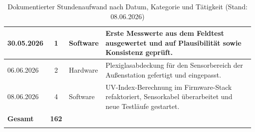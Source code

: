 \begin{longtable}{|l|c|l|p{7.5cm}|}
\hline
30.05.2026 & 1 & Software & Erste Messwerte aus dem Feldtest ausgewertet und auf Plausibilität sowie Konsistenz geprüft. \\
\hline
06.06.2026 & 2 & Hardware & Plexiglasabdeckung für den Sensorbereich der Außenstation gefertigt und eingepasst. \\
\hline
08.06.2026 & 4 & Software & UV-Index-Berechnung im Firmware-Stack refaktoriert, Sensorkabel überarbeitet und neue Testläufe gestartet. \\
\hline
\textbf{Gesamt} & \textbf{162} &  &  \\
\hline
\caption{Dokumentierter Stundenaufwand nach Datum, Kategorie und Tätigkeit (Stand: 08.06.2026)}\label{tab:stundenaufwand}\\
\end{longtable}
